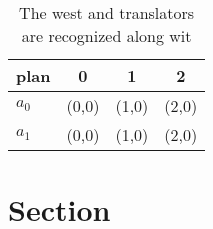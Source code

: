 \documentclass[a4paper]{article}
\begin{document}
\begin{table}
\begin{adjustbox}{width=0.6\columnwidth}
\begin{tabular}{|l|l|l|l|}
\hline
\textbf{plan} & \multicolumn{1}{c|}{\textbf{0}} & \multicolumn{1}{c|}{\textbf{1}} & \multicolumn{1}{c|}{\textbf{2}} \\ \hline
\textbf{$a_0$}  & (0,0) & (1,0) & (2,0) \\ \hline
\textbf{$a_1$}  & (0,0) & (1,0) & (2,0) \\ \hline
\end{tabular}
\end{adjustbox}
\caption{The west and translators are recognized along wit
}
\end{table}

\section{Section}
\end{document}
